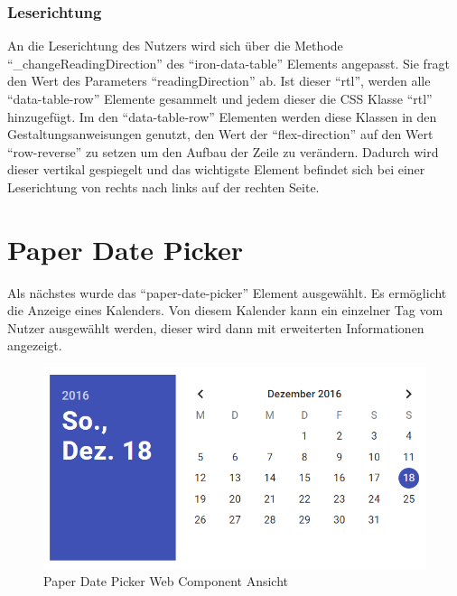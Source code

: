 \documentclass[12pt, paper=a4, bibtotoc, toc=listof, headsepline=true, numbers=endperiod]{scrreprt}
\begin{document}
	\subsubsection{Leserichtung}
	An die Leserichtung des Nutzers wird sich über die Methode \enquote{\_changeReadingDirection} des \enquote{iron-data-table} Elements angepasst. Sie fragt den Wert des Parameters \enquote{readingDirection} ab. Ist dieser \enquote{rtl}, werden alle \enquote{data-table-row} Elemente gesammelt und jedem dieser die CSS Klasse \enquote{rtl} hinzugefügt. Im den \enquote{data-table-row} Elementen werden diese Klassen in den Gestaltungsanweisungen genutzt, den Wert der \enquote{flex-direction} auf den Wert \enquote{row-reverse} zu setzen um den Aufbau der Zeile zu verändern. Dadurch wird dieser vertikal gespiegelt und das wichtigste Element befindet sich bei einer Leserichtung von rechts nach links auf der rechten Seite.
	\newpage	
	\section{Paper Date Picker}
	Als nächstes wurde das \enquote{paper-date-picker} Element ausgewählt\cite{datPic}. Es ermöglicht die Anzeige eines Kalenders. Von diesem Kalender kann ein einzelner Tag vom Nutzer ausgewählt werden, dieser wird dann mit erweiterten Informationen angezeigt.
		\begin{figure}[H]		
			\centering
			\includegraphics[width=\textwidth,height=\textheight,keepaspectratio]{datPic.png}
			\caption[Paper Date Picker]{Paper Date Picker Web Component Ansicht}
			\label{img:datPic}
		\end{figure}
\end{document}
